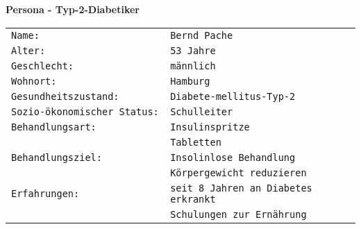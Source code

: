 		    
		    \textbf{Persona - Typ-2-Diabetiker}
		    \begin{center}
		    	\begin{longtable}[H]{p{6.6cm}p{6.6cm}}
		    		\addtocounter{table}{-1}
		    		\texttt{Name: }& \texttt{Bernd Pache}\\
		    		\texttt{Alter: }& \texttt{53 Jahre}\\
		    		\texttt{Geschlecht: }&\texttt{männlich}\\
		    		\texttt{Wohnort:} & \texttt{Hamburg}\\
		    		\texttt{Gesundheitszustand:} & \texttt{Diabete-mellitus-Typ-2}\\
		    		\texttt{Sozio-ökonomischer Status: }& \texttt{Schulleiter}\\
		    		\texttt{Behandlungsart:} & \texttt{Insulinspritze}\\
		    		&  \texttt{Tabletten}\\
		    		\texttt{Behandlungsziel:} &  \texttt{Insolinlose Behandlung}\\
		    		&  \texttt{Körpergewicht reduzieren}\\
		    		\texttt{Erfahrungen: }&  \texttt{seit 8 Jahren an Diabetes erkrankt}\\
		    		&  \texttt{Schulungen zur Ernährung}\\
		    	\end{longtable}
		    \end{center}
